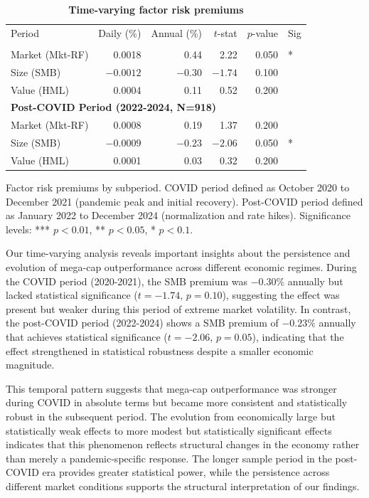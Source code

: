 \documentclass[10pt,letterpaper]{article}
\newlength\savedwidth
\newcommand\thickhline{\noalign{\global\savedwidth\arrayrulewidth\global\arrayrulewidth 2pt}%
\hline
\noalign{\global\arrayrulewidth\savedwidth}}
\begin{document}
\begin{table}[!htbp]
\centering
\caption{\textbf{Time-varying factor risk premiums}}
\begin{tabular}{lrrrrl}
\hline
Period & Daily (\%) & Annual (\%) & $t$-stat & $p$-value & Sig \\
\thickhline
\multicolumn{6}{l}{\textbf{COVID Period (2020-2021, N=300)}} \\
Market (Mkt-RF) & 0.0018 & 0.44 & 2.22 & 0.050 & * \\
Size (SMB) & $-0.0012$ & $-0.30$ & $-1.74$ & 0.100 & \\
Value (HML) & 0.0004 & 0.11 & 0.52 & 0.200 & \\
\hline
\multicolumn{6}{l}{\textbf{Post-COVID Period (2022-2024, N=918)}} \\
Market (Mkt-RF) & 0.0008 & 0.19 & 1.37 & 0.200 & \\
Size (SMB) & $-0.0009$ & $-0.23$ & $-2.06$ & 0.050 & * \\
Value (HML) & 0.0001 & 0.03 & 0.32 & 0.200 & \\
\hline
\end{tabular}
\begin{flushleft}
Factor risk premiums by subperiod. COVID period defined as October 2020 to December 2021 (pandemic peak and initial recovery). Post-COVID period defined as January 2022 to December 2024 (normalization and rate hikes). Significance levels: *** $p<0.01$, ** $p<0.05$, * $p<0.1$.
\end{flushleft}
\label{table:timevarying}
\end{table}

Our time-varying analysis reveals important insights about the persistence and evolution of mega-cap outperformance across different economic regimes. During the COVID period (2020-2021), the SMB premium was $-0.30\%$ annually but lacked statistical significance ($t=-1.74$, $p=0.10$), suggesting the effect was present but weaker during this period of extreme market volatility. In contrast, the post-COVID period (2022-2024) shows a SMB premium of $-0.23\%$ annually that achieves statistical significance ($t=-2.06$, $p=0.05$), indicating that the effect strengthened in statistical robustness despite a smaller economic magnitude.

This temporal pattern suggests that mega-cap outperformance was stronger during COVID in absolute terms but became more consistent and statistically robust in the subsequent period. The evolution from economically large but statistically weak effects to more modest but statistically significant effects indicates that this phenomenon reflects structural changes in the economy rather than merely a pandemic-specific response. The longer sample period in the post-COVID era provides greater statistical power, while the persistence across different market conditions supports the structural interpretation of our findings.
\end{document}
